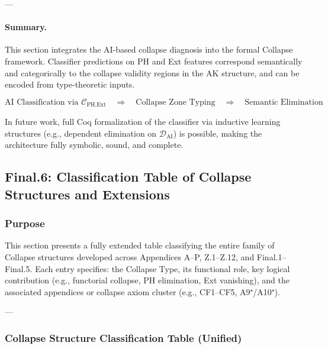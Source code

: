 \documentclass[11pt]{article}
\begin{document}
\begin{axiom}
\begin{axiom}
{{---

\paragraph{Summary.}

This section integrates the AI-based collapse diagnosis into the formal Collapse framework.  
Classifier predictions on PH and Ext features correspond semantically and categorically  
to the collapse validity regions in the AK structure, and can be encoded from  
type-theoretic inputs.

\[
\boxed{
\text{AI Classification via } \mathcal{C}_{\text{PH,Ext}} \quad
\Rightarrow \quad \text{Collapse Zone Typing} \quad
\Rightarrow \quad \text{Semantic Elimination}
}
\]

In future work, full Coq formalization of the classifier via inductive learning structures  
(e.g., dependent elimination on \( \mathcal{D}_{\text{AI}} \)) is possible, making the architecture  
fully symbolic, sound, and complete.




\subsection*{Final.6: Classification Table of Collapse Structures and Extensions}

\subsubsection*{Purpose}

This section presents a fully extended table classifying  
the entire family of Collapse structures developed across Appendices A–P, Z.1–Z.12, and Final.1–Final.5.  
Each entry specifies: the Collapse Type, its functional role, key logical contribution (e.g., functorial collapse, PH elimination, Ext vanishing),  
and the associated appendices or collapse axiom cluster (e.g., CF1–CF5, A9⁺/A10⁺).

---

\subsubsection*{Collapse Structure Classification Table (Unified)}

}}
\end{axiom}
\end{axiom}
\end{document}
